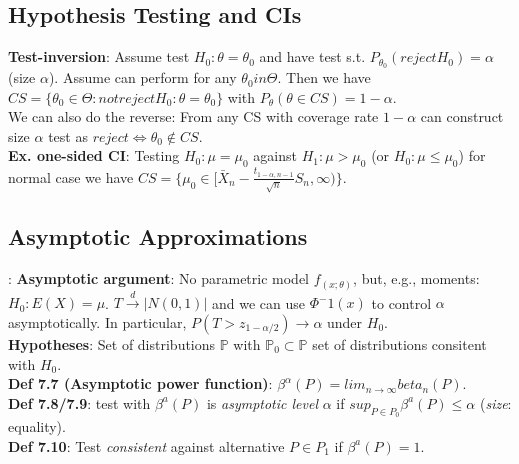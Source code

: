 \subsection{Hypothesis Testing and CIs}
\textbf{Test-inversion}: Assume test $H_0: \theta = \theta_0$ and have test s.t. $P_{\theta_0}(reject H_0) = \alpha$ (size $\alpha$). Assume can perform for any $\theta_0 in \Theta$. Then we have $CS = \{\theta_0\in\Theta: not reject H_0: \theta=\theta_0\}$ with $P_\theta(\theta\in CS) = 1-\alpha$.\\
We can also do the reverse: From any CS with coverage rate $1-\alpha$ can construct size $\alpha$ test as $reject\Leftrightarrow \theta_0\notin CS$.\\
\textbf{Ex. one-sided CI}: Testing $H_0: \mu = \mu_0$ against $H_1:\mu>\mu_0$ (or $H_0: \mu \leq \mu_0$) for normal case we have $CS = \{\mu_0 \in [\bar{X}_n - \frac{t_{1-\alpha, n-1}}{\sqrt{n}}S_n, \infty)\}$.

\subsection{Asymptotic Approximations}: 
\textbf{Asymptotic argument}: No parametric model $f_(x;\theta)$, but, e.g., moments: $H_0: E(X) = \mu$. $T\xrightarrow{d}|N(0,1)|$ and we can use $\Phi^-1(x)$ to control $\alpha$ asymptotically. In particular, $P(T>z_{1-\alpha/2})\rightarrow \alpha$ under $H_0$.\\ 
\textbf{Hypotheses}: Set of distributions $\mathbb{P}$ with $\mathbb{P}_0\subset\mathbb{P}$ set of distributions consitent with $H_0$.\\
\textbf{Def 7.7 (Asymptotic power function)}: $\beta^\alpha(P) = lim_{n\to\infty}beta_n(P)$.\\
\textbf{Def 7.8/7.9}: test with $\beta^a(P)$ is \emph{asymptotic level} $\alpha$ if $sup_{P\in P_0}\beta^a(P)\leq\alpha$ (\emph{size}: equality).\\
\textbf{Def 7.10}: Test \emph{consistent} against alternative $P\in P_1$ if $\beta^a(P) = 1$.